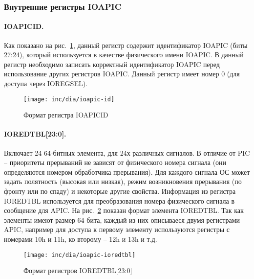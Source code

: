 \subsubsection*{Внутренние регистры IOAPIC}
\paragraph{IOAPICID.} Как показано на рис.~\ref{fig:ioapic-id}, данный регистр содержит идентификатор IOAPIC (биты 27:24),
который используется в качестве физического имени IOAPIC. В данный регистр необходимо записать корректный идентификатор
IOAPIC перед использование других регистров IOAPIC. Данный регистр имеет номер 0 (для доступа через IOREGSEL).
\begin{figure}[ht!]
  \centering
  \texttt{[image: inc/dia/ioapic-id]}
  \caption{Формат регистра IOAPICID}
  \label{fig:ioapic-id}
\end{figure}

\paragraph{IOREDTBL[23:0].} Включает 24 64-битных элемента, для 24х различных сигналов. В отличие от PIC -- приоритеты
прерываний не зависят от физического номера сигнала (они определяются номером обработчика прерывания). Для каждого
сигнала ОС может задать полятность (высокая или низкая), режим возникновения прерывания (по фронту или по спаду) и некоторые
другие свойства. Информация из регистра IOREDTBL используется для преобразования номера физического сигнала в сообщение для
APIC. На рис.~\ref{fig:ioapic-ioredtbl} показан формат элемента IOREDTBL. Так как элементы имеют размер 64-бита, каждый
из них описываеся двумя регистрами APIC, например для доступа к первому элементу используются регистры с номерами 10h и 11h,
ко второму -- 12h и 13h и т.д.

\begin{figure}[ht!]
  \centering
  \texttt{[image: inc/dia/ioapic-ioredtbl]}
  \caption{Формат регистров IOREDTBL[23:0]}
  \label{fig:ioapic-ioredtbl}
\end{figure}

